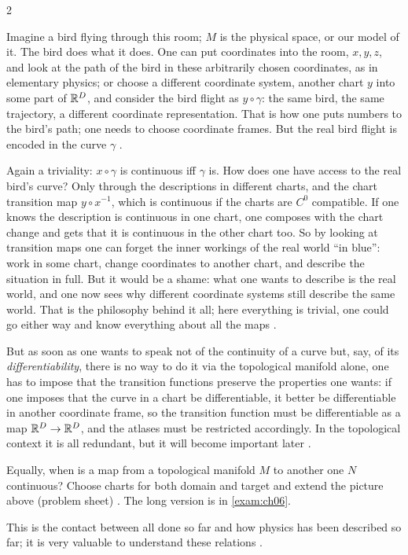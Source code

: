 \begin{paracol}{2}
\begin{intuition}\label{int:mf-bird}
Imagine a bird flying through this room; $M$ is the physical space, or our model of it. The bird does what it does. One can put coordinates into the room, $x,y,z$, and look at the path of the bird in these arbitrarily chosen coordinates, as in elementary physics; or choose a different coordinate system, another
chart $y$ into some part of $\mathbb{R}^D$, and consider the bird flight as $y\circ\gamma$: the same bird, the same trajectory, a different coordinate representation. That is how one puts numbers to the bird's path; one needs to choose coordinate frames. But the real bird flight is encoded in the curve $\gamma$
.
\end{intuition}
Again a triviality: $x\circ\gamma$ is continuous iff $\gamma$ is. How does one have access to the real bird's curve? Only through the descriptions in different charts, and the chart transition map $y\circ x^{-1}$, which is continuous if the charts are $C^0$ compatible. If one knows the description is continuous
in one chart, one composes with the chart change and gets that it is continuous in the other chart too. So by looking at transition maps one can forget the inner workings of the real world ``in blue'': work in some chart, change coordinates to another chart, and describe the situation in full. But it would be a shame:
what one wants to describe is the real world, and one now sees why different coordinate systems still describe the same world. That is the philosophy behind it all; here everything is trivial, one could go either way and know everything about all the maps
.

But as soon as one wants to speak not of the continuity of a curve but, say, of its \emph{differentiability}, there is no way to do it via the topological manifold alone, one has to impose that the transition functions preserve the properties one wants: if one imposes that the curve in a chart be differentiable, it better be differentiable in
another coordinate frame, so the transition function must be differentiable as a map $\mathbb{R}^D\to\mathbb{R}^D$, and the atlases must be restricted accordingly. In the topological context it is all redundant, but it will become important later .

\begin{exercise}\label{ex:mf-cont-charts}
Equally, when is a map from a topological manifold $M$ to another one $N$ continuous? Choose charts for both domain and target and extend the picture above (problem sheet) . The long version is in \cref{exam:ch06}.
\end{exercise}
This is the contact between all done so far and how physics has been described so far; it is very valuable to understand these relations .


\end{paracol}
